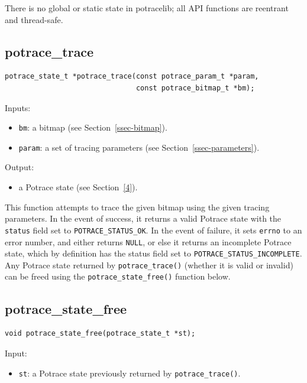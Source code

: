 \documentclass{article}
\begin{document}
There is no global or static state in potracelib; all API functions
are reentrant and thread-safe.

\subsection{potrace\_trace}\label{5a}

{\small
\begin{verbatim}
potrace_state_t *potrace_trace(const potrace_param_t *param,
                               const potrace_bitmap_t *bm);
\end{verbatim}
}

\noindent Inputs: 
\begin{itemize}
\item \verb!bm!: a bitmap (see Section~\ref{ssec-bitmap}).
\item \verb!param!: a set of tracing parameters (see
  Section~\ref{ssec-parameters}).
\end{itemize}

\noindent Output:
\begin{itemize}
\item a Potrace state (see Section~\ref{4}). 
\end{itemize}

This function attempts to trace the given bitmap using the given
tracing parameters. In the event of success, it returns a valid
Potrace state with the \verb!status! field set to
\verb!POTRACE_STATUS_OK!.  In the event of failure, it sets
\verb!errno! to an error number, and either returns \verb!NULL!, or
else it returns an incomplete Potrace state, which by definition has
the status field set to \verb!POTRACE_STATUS_INCOMPLETE!. Any Potrace
state returned by \verb!potrace_trace()! (whether it is valid or
invalid) can be freed using the \verb!potrace_state_free()! function
below.

\subsection{potrace\_state\_free}\label{5b}

\begin{verbatim}
void potrace_state_free(potrace_state_t *st);
\end{verbatim}

\noindent Input:
\begin{itemize}
\item \verb!st!: a Potrace state previously returned by
  \verb!potrace_trace()!.
\end{itemize}
\end{document}
